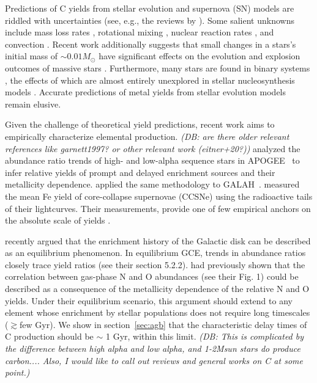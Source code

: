 \documentclass[fleqn,
usenatbib]{mnras}
\newcommand{\dbnote}[1]{ {\color{Thistle} \textit{\small (DB: #1)}} }
\begin{document}
Predictions of C yields from stellar evolution and supernova (SN) models are riddled with uncertainties (see, e.g., the reviews by \citealt{romano+10, KL14}).
Some salient unknowns include mass loss rates \citep{sukhbold+16, beasor+2020}, rotational mixing \citep{frischknecht+16, LC18}, nuclear reaction rates \citep{herwig+05, herwig+austin2004}, and convection \citep{chieffi2001, ventura+13}.
Recent work additionally suggests that small changes in a stars's initial mass of 
 $\sim$$0.01 M_\odot$  have significant effects on the evolution and explosion outcomes of massive stars \citep{bruenn+2023, vartanyan_burrows2023}.
 Furthermore, many stars are found in binary systems \citep{sana+12}, the effects of which are almost entirely
unexplored in stellar nucleosynthesis models \citet{farmer+21}.
Accurate predictions of metal yields from stellar evolution models remain elusive.

Given the challenge of theoretical yield predictions, recent work aims to empirically characterize elemental production. \dbnote{are there older relevant references like garnett1997? or other relevant work (eitner+20?)}
\citet{weinberg+19, weinberg+22} analyzed the abundance ratio trends of high- and low-alpha sequence stars in APOGEE~\citep{apogee17} to infer relative yields of prompt and delayed enrichment sources and their metallicity dependence.
\citet{emily+19, emily+22, emily+24} applied the same methodology to GALAH~\citep{DeSilva2015, Martell2017}.
\citet{rodriguez+21, rodriguez+23} measured the mean Fe yield of core-collapse supernovae (CCSNe) using the radioactive tails of their lightcurves.
Their measurements, provide one of few empirical anchors on the absolute scale of yields \citep{david_fe}.


\citet{james+24} recently argued that the enrichment history of the Galactic disk can be described as an equilibrium phenomenon.
In equilibrium GCE, trends in abundance ratios closely trace yield ratios (see their section 5.2.2).
\citet{james+23} had previously shown that the correlation between gas-phase N and O abundances (see their Fig. 1) could be described as a consequence of the metallicity dependence of the relative N and O yields.
Under their equilibrium scenario, this argument should extend to any element whose enrichment by stellar populations does not require long timescales ($\gtrsim$few Gyr).
We show in section~\ref{sec:agb} that the characteristic delay times of C production should be $\sim$ 1 Gyr, within this limit. 
\dbnote{This is complicated by the difference between high alpha and low alpha, and 1-2Msun stars do produce carbon.... Also, I would like to call out reviews and general works on C at some point.}
\end{document}
